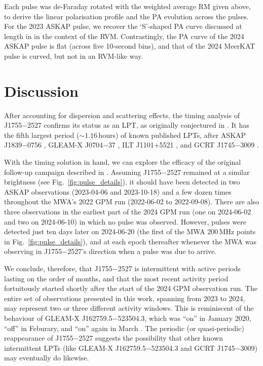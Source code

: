 \documentclass[fleqn,usenatbib]{mnras}
\newcommand{\src}{J1755$-$2527}
\newcommand{\Fig}{Fig.}
\begin{document}
Each pulse was de-Faraday rotated with the weighted average RM given above, to derive the linear polarisation profile and the PA evolution across the pulses.
For the 2023 ASKAP pulse, we recover the `S'-shaped PA curve discussed at length in  in the context of the RVM.
Contrastingly, the PA curve of the 2024 ASKAP pulse is flat (across five 10-second bins), and that of the 2024 MeerKAT pulse is curved, but not in an RVM-like way.

\section{Discussion} \label{sec:discussion}

After accounting for dispersion and scattering effects, the timing analysis of \src{} confirms its status as an LPT, as originally conjectured in .
It has the fifth largest period (${\sim}1.16\,$hours) of known published LPTs, after ASKAP J1839$-$0756 \citep[$6.45\,$hours;][]{Lee2025}, GLEAM-X J0704$-$37 \citep[$2.92\,$hours;][]{2024arXiv240815757H, 2025arXiv250103315R}, ILT J1101+5521 \citep[$2.09\,$hours;][]{deRuiter2025}, and GCRT J1745$-$3009 \citep[$1.28\,$hours;][]{2005Natur.434...50H}.

With the timing solution in hand, we can explore the efficacy of the original follow-up campaign described in .
Assuming \src{} remained at a similar brightness (see \Fig~\ref{fig:pulse_details}), it should have been detected in two ASKAP observations (2023-04-06 and 2023-10-18) and a few dozen times throughout the MWA's 2022 GPM run (2022-06-02 to 2022-09-08).
There are also three observations in the earliest part of the 2024 GPM run (one on 2024-06-02 and two on 2024-06-10) in which no pulse was observed.
However, pulses were detected just ten days later on 2024-06-20 (the first of the MWA 200\,MHz points in \Fig~\ref{fig:pulse_details}), and at each epoch thereafter whenever the MWA was observing in \src{}'s direction when a pulse was due to arrive.

We conclude, therefore, that \src{} is intermittent with active periods lasting on the order of months, and that the most recent activity period fortuitously started shortly after the start of the 2024 GPM observation run.
The entire set of observations presented in this work, spanning from 2023 to 2024, may represent two or three different activity windows.
This is reminiscent of the behaviour of GLEAM-X J162759.5$-$523504.3, which was ``on'' in January 2020, ``off'' in Feburary, and ``on'' again in March \citep{2022Natur.601..526H}.
The periodic (or quasi-periodic) reappearance of \src{} suggests the possibility that other known intermittent LPTs (like GLEAM-X J162759.5$-$523504.3 and GCRT J1745$-$3009) may eventually do likewise.
\end{document}
